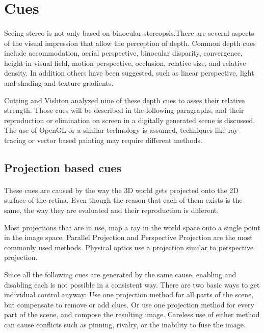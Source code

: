 \section{Cues\label{Cues}}
\paragraph{}
Seeing stereo is not only based on binocular stereopsis.There are several aspects of the visual impression that allow the perception of depth. Common depth cues include accommodation, aerial perspective, binocular disparity, convergence, height in visual field, motion perspective, occlusion, relative size, and relative density. In addition others have been suggested, such as linear perspective, light and shading and texture gradients.%

Cutting and Vishton\cite{DepthCues} analyzed nine of these depth cues to asses their relative strength. Those cues will be described in the following paragraphs, and their reproduction or elimination on screen in a digitally generated scene is discussed. The use of OpenGL or a similar technology is assumed, techniques like ray-tracing or vector based painting may require different methods.


\subsection{Projection based cues}
\paragraph{}
These cues are caused by the way the 3D world gets projected onto the 2D surface of the retina.
Even though the reason that each of them exists is the same, the way they are evaluated and their reproduction is different.

Most projections\cite{proj} that are in use, map a ray in the world space onto a single point in the image space. Parallel Projection\cite{parallel} and Perspective Projection\cite{perspective} are the most commonly used methods. Physical optics use a projection similar to perspective projection.

Since all the following cues are generated by the same cause, enabling and disabling each is not possible in a consistent way. There are two basic ways to get individual control anyway: Use one projection method for all parts of the scene, but compensate to remove or add clues. Or use one projection method for every part of the scene, and compose the resulting image. Careless use of either method can cause conflicts such as pinning, rivalry, or the inability to fuse the image.



